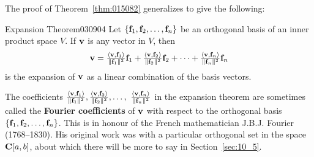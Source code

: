 The proof of Theorem~\ref{thm:015082} generalizes to give the following:

\begin{theorem}{Expansion Theorem}{030904}
Let $\{\textbf{f}_{1}, \textbf{f}_{2}, \dots, \textbf{f}_{n}\}$ be an orthogonal basis of an inner product space $V$. If $\textbf{v}$ is any vector in $V$, then
\begin{equation*}
\textbf{v} = 
\tfrac{\langle \textbf{v}, \textbf{f}_1 \rangle}{\| \textbf{f}_1 \| ^2} \textbf{f}_1 + 
\tfrac{\langle \textbf{v}, \textbf{f}_2 \rangle}{\| \textbf{f}_2 \| ^2} \textbf{f}_2 + \dots +
\tfrac{\langle \textbf{v}, \textbf{f}_n \rangle}{\| \textbf{f}_n \| ^2} \textbf{f}_n
\end{equation*}
is the expansion of $\textbf{v}$ as a linear combination of the basis vectors.
\end{theorem}

The coefficients $\tfrac{\langle \textbf{v}, \textbf{f}_1 \rangle}{\| \textbf{f}_1 \| ^2}, 
\tfrac{\langle \textbf{v}, \textbf{f}_2 \rangle}{\| \textbf{f}_2 \| ^2}, \dots,\
\tfrac{\langle \textbf{v}, \textbf{f}_n \rangle}{\| \textbf{f}_n \| ^2}$
 in the expansion theorem are sometimes called the \textbf{Fourier coefficients} of $\textbf{v}$ with respect to the orthogonal basis $\{\textbf{f}_{1}, \textbf{f}_{2}, \dots, \textbf{f}_{n}\}$.
 This is in honour of the French mathematician J.B.J. Fourier (1768--1830)\index{Fourier, J.B.J.}. His original work was with a particular orthogonal set in the space $\textbf{C}[a, b]$, about which there will be more to say in Section~\ref{sec:10_5}.

